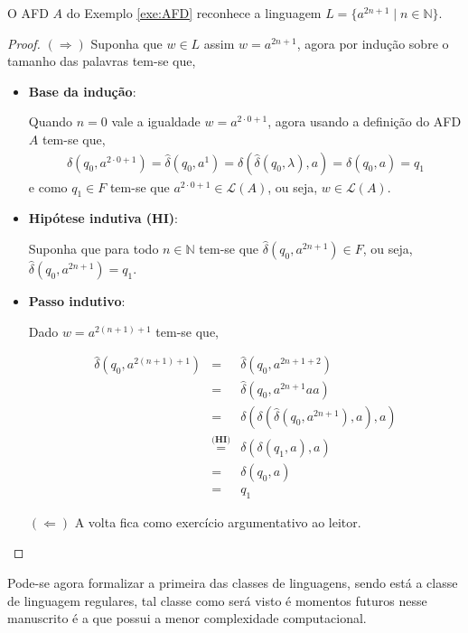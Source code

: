 \begin{exem}
	O AFD $A$ do Exemplo \ref{exe:AFD} reconhece a linguagem $L = \{a^{2n + 1} \mid n \in \mathbb{N}\}$.
	\begin{proof}
		$(\Rightarrow)$ Suponha que $w \in L$ assim $w = a^{2n+1}$, agora por indução sobre o tamanho das palavras tem-se que, 
		
		\begin{itemize}
			\item \textbf{Base da indução}:
			
			Quando $n = 0$ vale a igualdade $w = a^{2\cdot 0+1}$, agora usando a definição do AFD $A$ tem-se que, 
			\begin{eqnarray*}
				\widehat{\delta}(q_0, a^{2\cdot 0+1}) = \widehat{\delta}(q_0, a^{1}) = \delta(\widehat{\delta}(q_0, \lambda), a) = \delta(q_0, a) = q_1
			\end{eqnarray*}
			e como $q_1 \in F$ tem-se que $a^{2\cdot 0+1} \in \mathcal{L}(A)$, ou seja, $w \in \mathcal{L}(A)$.
			
			\item \textbf{Hipótese indutiva (HI)}:
			
			Suponha que para todo $n \in \mathbb{N}$ tem-se que $\widehat{\delta}(q_0, a^{2n+1}) \in F$, ou seja, $\widehat{\delta}(q_0, a^{2n+1}) = q_1$.
			
			\item \textbf{Passo indutivo}:
			
			Dado $w = a^{2(n+1)+1}$ tem-se que,
			
			\begin{eqnarray*}
				\widehat{\delta}(q_0, a^{2(n+1)+1}) & = & \widehat{\delta}(q_0, a^{2n+1+2})\\
				& = & \widehat{\delta}(q_0, a^{2n+1}aa)\\
				& = & \delta(\delta(\widehat{\delta}(q_0, a^{2n+1}), a), a)\\
				& \stackrel{\textbf{(HI)}}{=} & \delta(\delta(q_1, a), a)\\
				& = & \delta(q_0, a)\\
				& = & q_1
			\end{eqnarray*}
		
			$(\Leftarrow)$ A volta fica como exercício argumentativo ao leitor.
		\end{itemize}
	\end{proof}
\end{exem}

Pode-se agora formalizar a primeira das classes de linguagens, sendo está a classe de linguagem regulares, tal classe como será visto é momentos futuros nesse manuscrito é a que possui a menor complexidade computacional.

